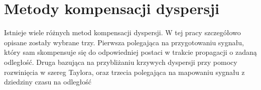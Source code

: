 
\chapter{Metody kompensacji dyspersji}
\label{cha:comp_disp}
 
Istnieje wiele różnych metod kompensacji dyspersji. W tej pracy szczegółowo opisane zostały wybrane trzy. Pierwsza polegająca na przygotowaniu sygnału, który sam skompensuje się do odpowiedniej postaci w trakcie propagacji o zadaną odległość. Druga bazująca na przybliżaniu krzywych dyspersji przy pomocy rozwinięcia w szereg Taylora, oraz trzecia polegająca na mapowaniu sygnału z dziedziny czasu na odległość 
 







